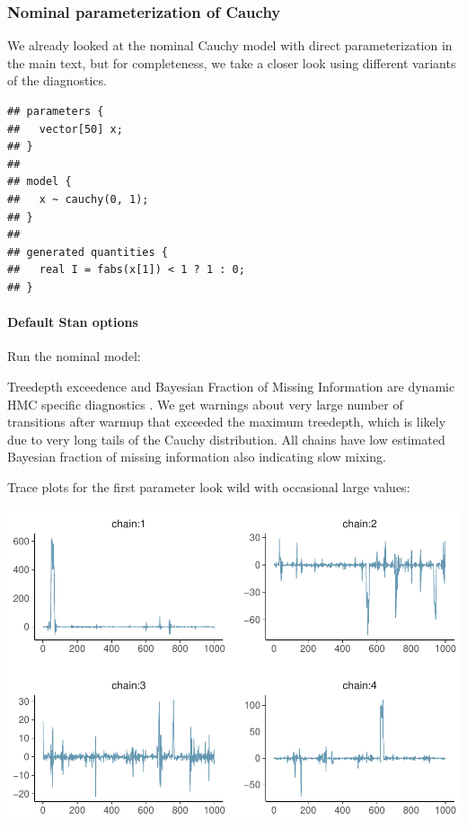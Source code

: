 \documentclass[american,]{article}
\let\oldparagraph\paragraph
\renewcommand{\paragraph}[1]{\oldparagraph{#1}\mbox{}}
\begin{document}
\hypertarget{nominal-parameterization-of-cauchy-1}{%
\subsubsection*{Nominal parameterization of
Cauchy}\label{nominal-parameterization-of-cauchy-1}}

We already looked at the nominal Cauchy model with direct
parameterization in the main text, but for completeness, we take a
closer look using different variants of the diagnostics.

\begin{verbatim}
## parameters {
##   vector[50] x;
## }
## 
## model {
##   x ~ cauchy(0, 1);
## }
## 
## generated quantities {
##   real I = fabs(x[1]) < 1 ? 1 : 0;
## }
\end{verbatim}

\hypertarget{default-stan-options-1}{%
\paragraph{Default Stan options}\label{default-stan-options-1}}

Run the nominal model:

Treedepth exceedence and Bayesian Fraction of Missing Information are
dynamic HMC specific diagnostics \citep{betancourt2017conceptual}. We
get warnings about very large number of transitions after warmup that
exceeded the maximum treedepth, which is likely due to very long tails
of the Cauchy distribution. All chains have low estimated Bayesian
fraction of missing information also indicating slow mixing.

Trace plots for the first parameter look wild with occasional large
values:

\includegraphics{graphics/trace-fit-nom-1.pdf}
\end{document}
